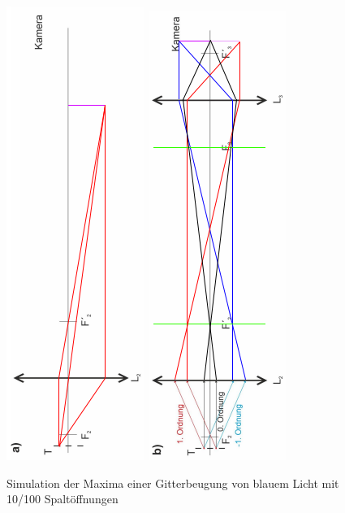 \documentclass[12pt,a4paper,twoside]{article}
\begin{document}
\begin{figure}[H]
    \centering
    \includegraphics[width=0.3\linewidth, angle=-90]{nudes/Strahlenganga.png}
    \includegraphics[width=0.3\linewidth, angle=-90]{nudes/Strahlengangb.png}
    \caption{Simulation der Maxima einer Gitterbeugung von blauem Licht mit 10/100 Spaltöffnungen}
    \label{fig:SimulationBlau}
\end{figure}
\end{document}
